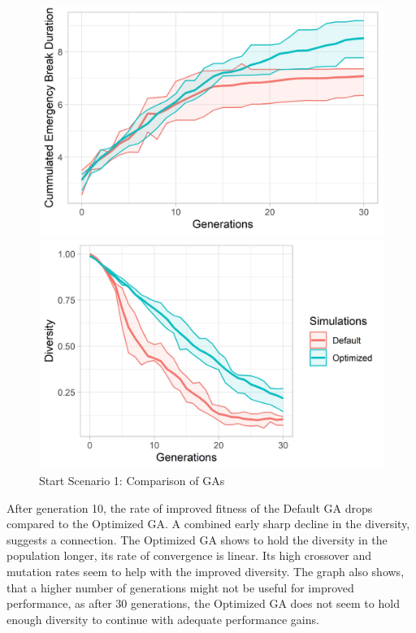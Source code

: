 \begin{figure}[ht] 
	\label{fig:evaluation:sim_1_ga_comparison}
	\begin{minipage}[b]{0.5\linewidth}
		\centering
		\includegraphics[width=1\linewidth]{simulations/evaluation/plots/sim_1_ga_generations} 
	\end{minipage}%
	\begin{minipage}[b]{0.5\linewidth}
		\centering
		\includegraphics[width=1\linewidth]{simulations/evaluation/plots/sim_1_ga_diversity} 
	\end{minipage} 
	\caption{Start Scenario 1: Comparison of GAs}
\end{figure}

After generation 10, the rate of improved fitness of the Default GA drops compared to the Optimized GA. A combined early sharp decline in the diversity, suggests a connection. The Optimized GA shows to hold the diversity in the population longer, its rate of convergence is linear. Its high crossover and mutation rates seem to help with the improved diversity. The graph also shows, that a higher number of generations might not be useful for improved performance, as after 30 generations, the Optimized GA does not seem to hold enough diversity to continue with adequate performance gains. 


